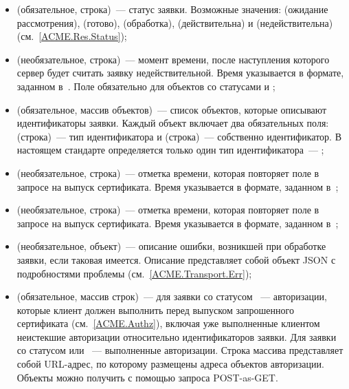 \begin{itemize}
\item
{} (обязательное, строка)~--- статус заявки.
%
Возможные значения:  (ожидание рассмотрения), 
 (готово),  (обработка), 
 (действительна) и  (недействительна) 
(см.~\ref{ACME.Res.Status});

\item
{} (необязательное, строка)~--- момент времени,
после наступления которого сервер будет считать заявку недействительной.
%
Время указывается в формате, заданном в~\cite{RFC3339}. 
%
Поле обязательно для объектов со статусами  и ;

\item
{} (обязательное, массив объектов)~--- список объектов,
которые описывают идентификаторы заявки. 
%
Каждый объект включает два обязательных поля:  (строка)~---
тип идентификатора и  (строка)~--- собственно идентификатор.
%
В настоящем стандарте определяется только один тип идентификатора~--- 
;

\item
{} (необязательное, строка)~--- отметка времени,
которая повторяет поле  в запросе на выпуск 
сертификата. 
%
Время указывается в формате, заданном в~\cite{RFC3339};

\item
{} (необязательное, строка)~--- отметка времени,
которая повторяет поле  в запросе на выпуск 
сертификата. 
%
Время указывается в формате, заданном в~\cite{RFC3339};

\item
{} (необязательное, объект)~--- описание ошибки,
возникшей при обработке заявки, если таковая имеется. 
Описание представляет собой объект JSON с подробностями проблемы
(см.~\ref{ACME.Transport.Err});

\item
{} (обязательное, массив строк)~--- для заявки со статусом  
~--- авторизации, которые клиент должен выполнить перед 
выпуском запрошенного сертификата (см.~\ref{ACME.Authz}), включая уже 
выполненные клиентом неистекшие авторизации относительно идентификаторов 
заявки. 
%
Для заявки со статусом  или ~---
выполненные авторизации. 
%
Строка массива  представляет собой URL-адрес, 
по которому размещены адреса объектов авторизации. Объекты можно получить 
с помощью запроса POST-as-GET.


\end{itemize}
